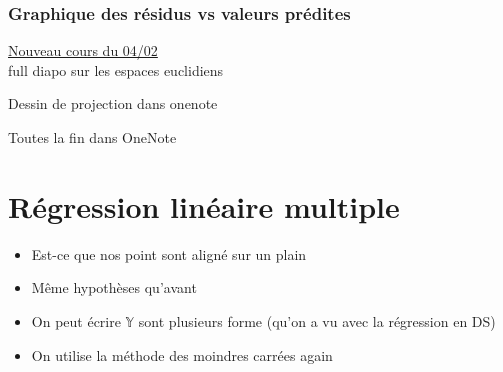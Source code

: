 \documentclass{article}
\theoremstyle{plain}%
\theoremstyle{definition}
\theoremstyle{remark}
\begin{document}
\subsubsection{Graphique des résidus vs valeurs prédites}

\underline{Nouveau cours du 04/02} \\
full diapo sur les espaces euclidiens 

Dessin de projection dans onenote 

Toutes la fin dans OneNote 

\section{Régression linéaire multiple}
\begin{itemize}
    \item Est-ce que nos point sont aligné sur un plain
    \item Même hypothèses qu'avant
    \item On peut écrire $ \mathbb{Y} $  sont plusieurs forme (qu'on a vu avec la régression en DS)
    \item On utilise la méthode des moindres carrées again
\end{itemize}
\end{document}
